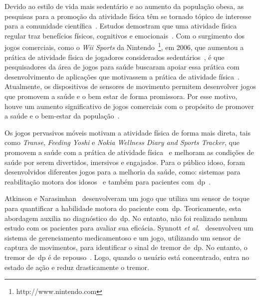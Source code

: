 Devido ao estilo de vida mais sedentário e ao aumento da população obesa, as pesquisas para a promoção da atividade física têm se tornado tópico de interesse para a comunidade científica~\cite{maitland2009,bartolome11,Mandryk2014}. Estudos demostram que uma atividade física regular traz benefícios físicos, cognitivos e emocionais~\cite{Mandryk2014}. Com o surgimento dos jogos comerciais, como o \textit{Wii Sports} da Nintendo~\footnote{http://www.nintendo.com}, em 2006, que aumentou a prática de atividade física de jogadores considerados sedentários~\cite{wiigraves2008}, é que pesquisadores da área de jogos para saúde buscaram apoiar essa prática com desenvolvimento de aplicações que motivassem a prática de atividade física~\cite{stacey2011}. Atualmente, os dispositivos de sensores de movimento permitem desenvolver jogos que promovem a saúde e o bem estar de forma promissora. Por esse motivo, houve um aumento significativo de jogos comerciais com o propósito de promover a saúde e o bem-estar da população~\cite{Papastergiou:2009:EPC:1570538.1570707}.


Os jogos pervasivos móveis motivam a atividade física de forma mais direta, tais como \textit{Transe}, \textit{Feeding Yoshi} e  \textit{Nokia Wellness Diary and Sports Tracker}, que promovem a saúde com a prática de atividade física~\cite{Suhonen:2008:SFE:1457199.1457204} e melhoram as condições de saúde por serem divertidos, imersivos e engajados. Para o público idoso, foram desenvolvidos diferentes jogos para a melhoria da saúde, como: sistemas para reabilitação motora dos idosos~\cite{brox11} e também para pacientes com~\ac{dp}~\cite{atkinson2010,synnott_wiipd_2012,sacbespoke2014}. 

Atkinson e Narasimhan~\cite{atkinson2010} desenvolveram um jogo que utiliza um sensor de toque para quantificar a habilidade motora do paciente com~\ac{dp}. Teoricamente, esta abordagem auxilia no diagnóstico do~\ac{dp}. No entanto, não foi realizado nenhum estudo com os pacientes para avaliar sua eficácia. Synnott \textit{et al.}~\cite{synnott_wiipd_2012} desenvolveu um sistema de gerenciamento medicamentoso e um jogo, utilizando um sensor de captura de movimentos, para identificar o sinal de tremor de~\ac{dp}. No entanto, o tremor de~\ac{dp} é de repouso~\cite{national2006parkinson}. Logo, quando o usuário está concentrado, entra no estado de ação e reduz drasticamente o tremor.


